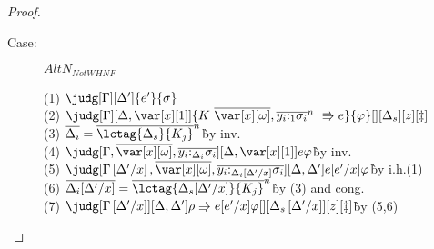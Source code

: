 \begin{proof}
\begin{description}
\item[Case:] $AltN_{Not WHNF}$
\begin{tabbing}
    (1) $\judg[\G][\D']{e'}{\s}$\\
    (2) $\judg[\G][\D,\xl]{\konstructor~\Rrightarrow e}{\vp}[][\D_s][z][\ddag]$\\
    (3) $\ov{\D_i}=\ov{\lctag{\D_s}{K_j}}^n$\`by inv.\\
    (4) $\judg[\G,\ov{\xo},\ov{y_i{:}_{\D_i}\s_i}][\D,\xl]{e}{\vp}$\`by inv.\\
    (5) $\judg[\subst{\G}{\D'}{x},\ov{\xo},\ov{y_i{:}_{\subst{\D_i}{\D'}{x}}\s_i}][\D,\D']{e[e'/x]}{\vp}$\` by i.h.(1)\\
    (6) $\ov{\D_i[\D'/x]}=\ov{\lctag{\D_s[\D'/x]}{K_j}}^n$\`by (3) and cong.\\
    (7) $\judg[\subst{\G}{\D'}{x}][\D,\D']{\rho \Rrightarrow e[e'/x]}{ \vp}[][\subst{\D_s}{\D'}{x}][z][\ddag]$\` by (5,6)\\
\end{tabbing}


\end{description}
\end{proof}
